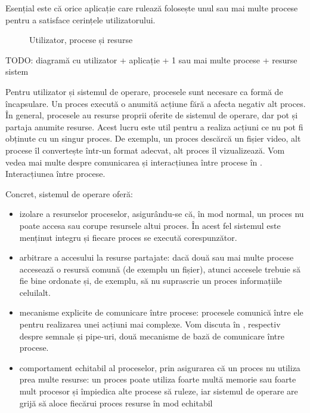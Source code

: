 \begin{note}
Esențial este că orice aplicație care rulează folosește unul sau mai multe procese pentru a satisface cerințele utilizatorului.
\end{note}

\begin{figure}[!htbp]
	\centering
	\def\svgwidth{0.8\textwidth}
        
        \caption{Utilizator, procese și resurse}
        \label{fig:process-overview}
\end{figure}
TODO: diagramă cu utilizator + aplicație + 1 sau mai multe procese + resurse sistem

Pentru utilizator și sistemul de operare, procesele sunt necesare ca formă de
încapsulare. Un proces execută o anumită acțiune fără a afecta negativ alt
proces. În general, procesele au resurse proprii oferite de sistemul de operare,
dar pot și partaja anumite resurse. Acest lucru este util pentru a realiza
acțiuni ce nu pot fi obținute cu un singur proces. De exemplu, un proces
descărcă un fișier video, alt procese îl convertește într-un format adecvat, alt
proces îl vizualizează. Vom vedea mai multe despre comunicarea și interacțiunea
între procese în . Interacțiunea
între procese.

Concret, sistemul de operare oferă:

\begin{itemize}
	\item izolare a resurselor proceselor, asigurându-se că, în mod normal,
		un proces nu poate accesa sau corupe resursele altui proces. În
		acest fel sistemul este menținut integru și fiecare proces se
		execută corespunzător.
	\item arbitrare a accesului la resurse partajate: dacă două sau mai
		multe procese accesează o resursă comună (de exemplu un fișier),
		atunci accesele trebuie să fie bine ordonate și, de exemplu, să
		nu suprascrie un proces informațiile celuilalt.
	\item mecanisme explicite de comunicare între procese: procesele
		comunică între ele pentru realizarea unei acțiuni mai complexe.
                Vom discuta în , respectiv  despre semnale și pipe-uri,
		două mecanisme de bază de comunicare între procese.
	\item comportament echitabil al proceselor, prin asigurarea că un proces
		nu utiliza prea multe resurse: un proces poate utiliza foarte
		multă memorie sau foarte mult procesor și împiedica alte procese
		să ruleze, iar sistemul de operare are grijă să aloce fiecărui
		proces resurse în mod echitabil
\end{itemize}

